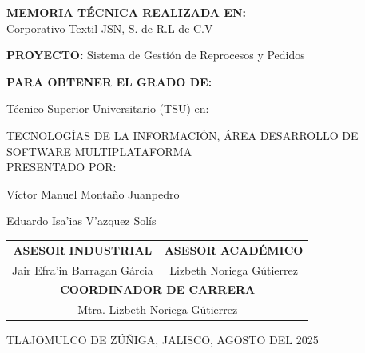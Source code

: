 \documentclass[12pt,letterpaper,spanish]{report}
\begin{document}
\begin{center}

\large{\textbf{MEMORIA TÉCNICA REALIZADA EN:}}
 \\  Corporativo Textil JSN, S. de R.L de C.V

\centerline{\hbox{}}

\large{\textbf{PROYECTO:} Sistema de Gestión de Reprocesos y Pedidos}

\vspace{0.1in}
\large{\textbf{PARA OBTENER EL GRADO DE:}}

\large{Técnico Superior Universitario (TSU) en:}
\vspace{0.05in}

\large{TECNOLOGÍAS DE LA INFORMACIÓN, ÁREA DESARROLLO DE SOFTWARE MULTIPLATAFORMA }
\\
\large{PRESENTADO POR:}


Víctor Manuel Montaño Juanpedro %


Eduardo Isa'ias V'azquez Solís %

\vspace{0.5in}

\begin{tabular}{cc}
    \textbf{ASESOR INDUSTRIAL} & \textbf{ASESOR ACADÉMICO} \\

    Jair Efra'in Barragan Gárcia & Lizbeth Noriega Gútierrez \\
    \multicolumn{2}{c}{\textbf{COORDINADOR DE CARRERA}
    \vspace{0.4in}
    } \\

    \multicolumn{2}{c}{
            Mtra. Lizbeth Noriega Gútierrez }
    \end{tabular}

\end{center}
\begin{flushright}\small{ TLAJOMULCO DE ZÚÑIGA, JALISCO, AGOSTO DEL 2025} \end{flushright}



\end{document}
